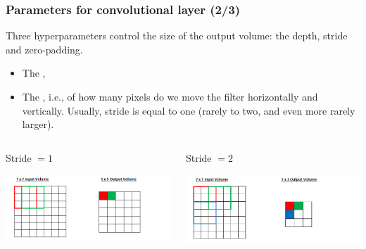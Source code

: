 \begin{frame}
	\frametitle{Parameters for convolutional layer (2/3)}

	Three hyperparameters control the size of the output volume: the depth, stride and zero-padding.

	\bigskip

	\begin{itemize}
		\item The ,

		\item The , i.e., of how many pixels do we move the filter horizontally and vertically. Usually, stride is equal to one (rarely to two, and even more rarely larger).
	\end{itemize}


	\begin{columns}[T] %
		\hspace{0.2cm}
		\begin{column}{.5\textwidth}
			Stride $=1$
			\begin{center}
				\includegraphics[scale=0.4]{figs/Stride1}
			\end{center}
		\end{column}%
		\vrule{}
		\hspace{0.2cm}
		\begin{column}{.5\textwidth}
			Stride $=2$
			\begin{center}
				\includegraphics[scale=0.4]{figs/Stride2}
			\end{center}
		\end{column}%
	\end{columns}

\end{frame}

